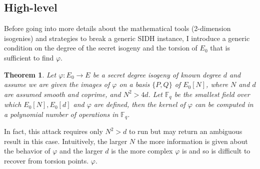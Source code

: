 \documentclass[12pt,a4paper]{article}
\newtheorem{theorem}{Theorem}
\begin{document}
	\subsection{High-level}
	Before going into more details about the mathematical tools (2-dimension isogenies)
	and strategies to break a generic SIDH instance, I introduce a generic condition
	on the degree of the secret isogeny and the torsion of $E_0$ that is sufficient
	to find $\varphi$.
	\begin{theorem}{\cite{sidhpolyattack}}
		Let $\varphi:E_0 \to E$ be a secret degree isogeny of known degree $d$
		and assume we are given the images of $\varphi$ on a basis $\{P,Q\}$ of $E_0[N]$,
		where $N$ and $d$ are assumed smooth and coprime, and $N^2 > 4d$. Let $\mathbb{F}_q$ be the
		smallest field over which $E_0[N],E_0[d]$ and $\varphi$ are defined, then the kernel of
		$\varphi$ can be computed in a polynomial number of operations in $\mathbb{F}_q$.
	\end{theorem}
	In fact, this attack requires only $N^2>d$ to run but may return an ambiguous result
	in this case. Intuitively, the larger $N$ the more information is given about
	the behavior of $\varphi$ and the larger $d$ is the more complex $\varphi$ is and
	so is difficult to recover from torsion points.
	$\varphi$.
\end{document}
